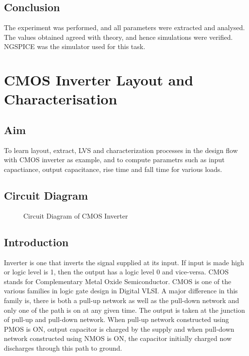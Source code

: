 \documentclass[12pt, a4paper]{article}
\begin{document}
	\subsection{Conclusion}
	The experiment was performed, and all parameters were extracted and analysed. The values obtained agreed with theory, and hence simulations were verified. NGSPICE was the simulator used for this task.
	
	
	
	
	\newpage
	\section{CMOS Inverter Layout and Characterisation} 
	\subsection{Aim}
	To learn layout, extract, LVS and characterization processes in the design flow with CMOS inverter as example, and to compute parametrs such as input capactiance, output capacitance, rise time and fall time for various loads.
	\subsection{Circuit Diagram}
	\begin{figure}[H]
		\begin{center}
			
			\caption{Circuit Diagram of CMOS Inverter}
			\label{fig::cmosinvckt}
		\end{center}
	\end{figure}
	
	\subsection{Introduction}
	Inverter is one that inverts the signal supplied at its input. If input is made high or logic level is 1, then the output has a logic level 0 and vice-versa. CMOS stands for Complementary Metal Oxide Semiconductor. CMOS is one of the various families in logic gate design in Digital VLSI. A major difference in this family is, there is both a pull-up network as well as the pull-down network and only one of the path is on at any given time. The output is taken at the junction of pull-up and pull-down network. When pull-up network constructed using PMOS is ON, output capacitor is charged by the supply and when pull-down network constructed using NMOS is ON, the capacitor initially charged now discharges through this path to ground.
	
\end{document}
